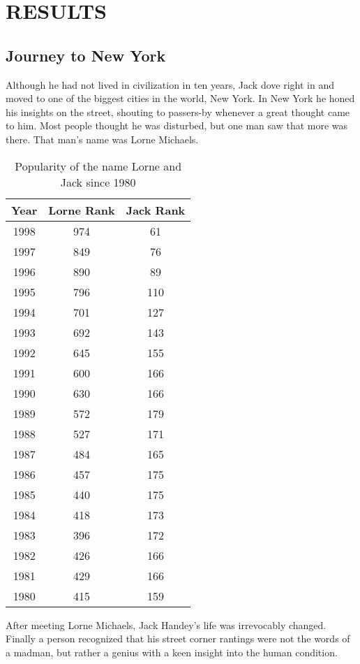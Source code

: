 \chapter{RESULTS} \label{ch:results}%

\section{Journey to New York} \label{sec:Jack New York} %

Although he had not lived in civilization in ten years, Jack dove right in and moved to one of the biggest cities in the world, New York.  In New York he honed his insights on the street, shouting to passers-by whenever a great thought came to him.  Most people thought he was disturbed, but one man saw that more was there.  That man's name was Lorne Michaels.  

\begin{table}[htbp]
  \centering
    \begin{tabular}{ccc}
    \toprule
    \textbf{Year} & \textbf{Lorne Rank} & \textbf{Jack Rank} \cite{SSA2016} \\
    \midrule
    1998  & 974   & 61 \\
    1997  & 849   & 76 \\
    1996  & 890   & 89 \\
    1995  & 796   & 110 \\
    1994  & 701   & 127 \\
    1993  & 692   & 143 \\
    1992  & 645   & 155 \\
    1991  & 600   & 166 \\
    1990  & 630   & 166 \\
    1989  & 572   & 179 \\
    1988  & 527   & 171 \\
    1987  & 484   & 165 \\
    1986  & 457   & 175 \\
    1985  & 440   & 175 \\
    1984  & 418   & 173 \\
    1983  & 396   & 172 \\
    1982  & 426   & 166 \\
    1981  & 429   & 166 \\
    1980  & 415   & 159 \\
    \bottomrule
    \end{tabular}%
  \caption{Popularity of the name Lorne and Jack since 1980}
  \label{tab:Popularity of Lorne and Jack}%
\end{table}%

After meeting Lorne Michaels, Jack Handey's life was irrevocably changed.  Finally a person recognized that his street corner rantings were not the words of a madman, but rather a genius with a keen insight into the human condition.
